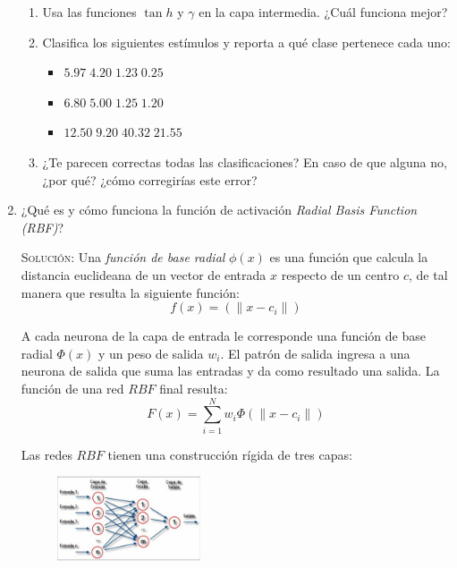 \documentclass[letterpaper,11pt]{article}
\begin{document}
\begin{enumerate}
\begin{enumerate}
        \item Usa las funciones $\tan h$ y $\gamma$ en la capa intermedia. ¿Cuál
        funciona mejor?

        \item Clasifica los siguientes estímulos y reporta a qué clase pertenece
        cada uno:
        \begin{itemize}
            \item $5.97 \; 4.20 \; 1.23 \; 0.25$
            \item $6.80 \; 5.00 \; 1.25 \; 1.20$
            \item $12.50 \; 9.20 \; 40.32 \; 21.55$
        \end{itemize}

        \item ¿Te parecen correctas todas las clasificaciones? En caso de que 
        alguna no, ¿por qué? ¿cómo corregirías este error?
    \end{enumerate}

    \item ¿Qué es y cómo funciona la función de activación \textit{Radial Basis
    Function (RBF)}?

    \textsc{Solución:} Una \textit{función de base radial} $\phi(x)$ es una 
    función que calcula la distancia euclideana de un vector de entrada $x$
    respecto de un centro $c$, de tal manera que resulta la siguiente función:
    \begin{equation*}
        f(x) = (\| x - c_i\|)
    \end{equation*}

    A cada neurona de la capa de entrada le corresponde una función de base 
    radial $\Phi (x)$ y un peso de salida $w_i$. El patrón de salida ingresa a
    una neurona de salida que suma las entradas y da como resultado una salida.
    La función de una red $RBF$ final resulta:
    \begin{equation*}
        F(x) = \sum^N_{i=1} w_{i} \Phi (\| x - c_{i} \|)
    \end{equation*} 

    Las redes $RBF$ tienen una construcción rígida de tres capas:
    \begin{figure}[ht]
        \centering
        \includegraphics[width=0.4\textwidth]{./imagenes/rbf.png}
    \end{figure}  


\end{enumerate}
\end{document}
